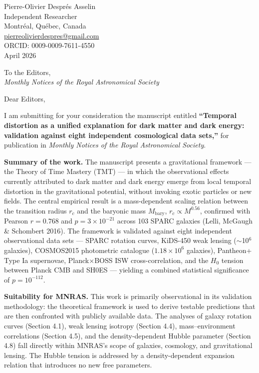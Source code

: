 \documentclass[12pt]{article}
\begin{document}
\begin{flushright}
  Pierre-Olivier Despr\'{e}s Asselin \\
  Independent Researcher \\
  Montr\'{e}al, Qu\'{e}bec, Canada \\
  \href{mailto:pierreolivierdespres@gmail.com}{pierreolivierdespres@gmail.com} \\
  ORCID: 0009-0009-7611-4550 \\[6pt]
  April 2026
\end{flushright}

\bigskip

\noindent
To the Editors, \\
\textit{Monthly Notices of the Royal Astronomical Society}

\bigskip

Dear Editors,

I am submitting for your consideration the manuscript entitled
\textbf{``Temporal distortion as a unified explanation for dark matter
and dark energy: validation against eight independent cosmological
data sets,''} for publication in \textit{Monthly Notices of the Royal
Astronomical Society}.

\bigskip

\textbf{Summary of the work.}
The manuscript presents a gravitational framework --- the Theory of
Time Mastery (TMT) --- in which the observational effects currently
attributed to dark matter and dark energy emerge from local temporal
distortion in the gravitational potential, without invoking exotic
particles or new fields. The central empirical result is a
mass-dependent scaling relation between the transition radius $r_c$
and the baryonic mass $M_\mathrm{bary}$, $r_c \propto M^{0.56}$,
confirmed with Pearson $r = 0.768$ and $p = 3\times10^{-21}$ across
103 SPARC galaxies (Lelli, McGaugh \& Schombert 2016). The framework
is validated against eight independent observational data sets ---
SPARC rotation curves, KiDS-450 weak lensing ($\sim$10$^{6}$
galaxies), COSMOS2015 photometric catalogue
($1.18\times10^{6}$ galaxies), Pantheon+ Type Ia supernovae,
Planck$\times$BOSS ISW cross-correlation, and the $H_{0}$ tension
between Planck CMB and SH0ES --- yielding a combined statistical
significance of $p = 10^{-112}$.

\bigskip

\textbf{Suitability for MNRAS.}
This work is primarily observational in its validation methodology:
the theoretical framework is used to derive testable predictions that
are then confronted with publicly available data. The analyses of
galaxy rotation curves (Section 4.1), weak lensing isotropy (Section
4.4), mass--environment correlations (Section 4.5), and the
density-dependent Hubble parameter (Section 4.8) fall directly within
MNRAS's scope of galaxies, cosmology, and gravitational lensing. The
Hubble tension is addressed by a density-dependent expansion relation
that introduces no new free parameters.
\end{document}
